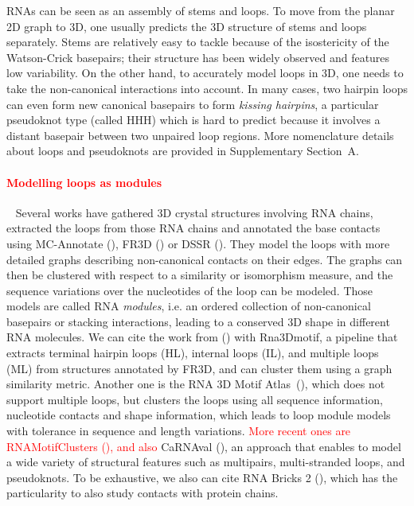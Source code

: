 \documentclass{bioinfo}
\begin{document}
RNAs can be seen as an assembly of stems and loops. To move from the planar 2D graph to 3D, one usually predicts the 3D structure of stems and loops separately. Stems are relatively easy to tackle because of the isostericity of the Watson-Crick basepairs; their structure has been widely observed and features low variability. On the other hand, to accurately model loops in 3D, one needs to take the non-canonical interactions into account. In many cases, two hairpin loops can even form new canonical basepairs to form \textit{kissing hairpins}, a particular pseudoknot type (called HHH) which is hard to predict because it involves a distant basepair between two unpaired loop regions. More nomenclature details about loops and pseudoknots are provided in Supplementary Section~A.

\paragraph{\textcolor{red}{Modelling loops as modules}} ~  Several works have gathered 3D crystal structures involving RNA chains, extracted the loops from those RNA chains and annotated the base contacts using MC-Annotate (\citealp{gendron2001quantitative}), FR3D (\citealp{sarver_fr3d:_2008}) or DSSR (\citealp{lu_dssr:_2015}). 
They model the loops with more detailed graphs describing non-canonical contacts on their edges. 
The graphs can then be clustered with respect to a similarity or isomorphism measure, and the sequence variations over the nucleotides of the loop can be modeled. 
Those models are called RNA \textit{modules}, i.e. an ordered collection of non-canonical basepairs or stacking interactions, leading to a conserved 3D shape in different RNA molecules. 
We can cite the work from (\citealp{djelloul_automated_2008}) with Rna3Dmotif, a pipeline that extracts terminal hairpin loops (HL), internal loops (IL), and multiple loops (ML) from structures annotated by FR3D, and can cluster them using a graph similarity metric. 
Another one is the RNA 3D Motif Atlas~(\citealp{petrov_automated_2013}), which does not support multiple loops, but clusters the loops using all sequence information, nucleotide contacts and shape information, which leads to loop module models with tolerance in sequence and length variations. 
\textcolor{red}{More recent ones are RNAMotifClusters (\citealp{ge2018novo}), and also} CaRNAval (\citealp{reinharz2018mining}), an approach that enables to model a wide variety of structural features such as multipairs, multi-stranded loops, and pseudoknots. 
To be exhaustive, we also can cite RNA Bricks 2 (\citealp{chojnowski2014rna}), which has the particularity to also study contacts with protein chains. 
\end{document}
